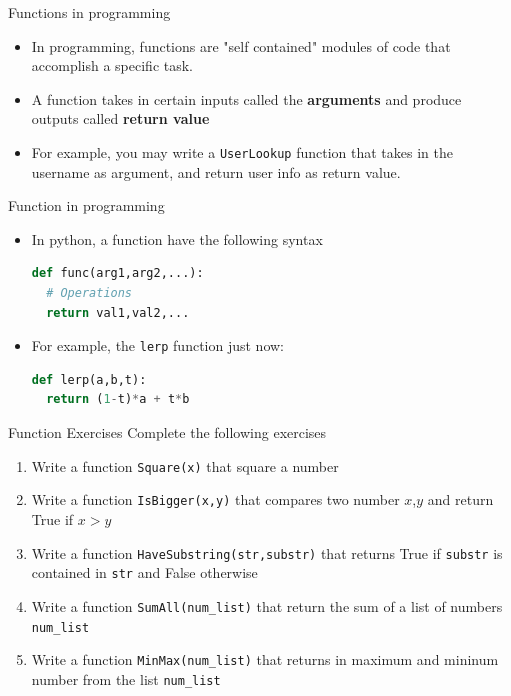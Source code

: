 \documentclass[10pt,xcolor={table,dvipsnames},t]{beamer}
\begin{document}
\begin{frame}{Functions in programming}
  \begin{itemize}
    \item In programming, functions are "self contained" modules of code that accomplish a specific task.
    \item A function takes in certain inputs called the \textbf{arguments} and produce outputs called \textbf{return value}
    \item For example, you may write a \texttt{UserLookup} function that takes in the username as argument, and return user info as return value.
  \end{itemize}
\end{frame}

\begin{frame}[fragile]{Function in programming}
  \begin{itemize}
    \item In python, a function have the following syntax
\begin{lstlisting}[language=python]
def func(arg1,arg2,...):
  # Operations
  return val1,val2,...
\end{lstlisting}
  \item For example, the \texttt{lerp} function just now:
\begin{lstlisting}[language=python]
def lerp(a,b,t):
  return (1-t)*a + t*b
\end{lstlisting}
  \end{itemize}
\end{frame}

\begin{frame}{Function Exercises}
  Complete the following exercises
  \begin{enumerate}
    \item Write a function \texttt{Square(x)} that square a number 
    \item Write a function \texttt{IsBigger(x,y)} that compares two number $x$,$y$ and return True if $x>y$
    \item Write a function \texttt{HaveSubstring(str,substr)} that returns True if \texttt{substr} is contained in \texttt{str} and False otherwise 
    \item Write a function \texttt{SumAll(num\_list)} that return the sum of a list of numbers \texttt{num\_list}
    \item Write a function \texttt{MinMax(num\_list)} that returns in maximum and mininum number from the list \texttt{num\_list}
  \end{enumerate}
\end{frame}
\end{document}
